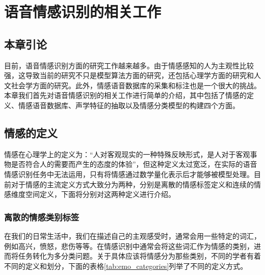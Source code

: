 \chapter{语音情感识别的相关工作}
\label{cha:basic_konwledge}

\section{本章引论}
\label{sec:basic_konwledge_intro}
目前，语音情感识别方面的研究工作越来越多。由于情感感知的人为主观性比较强，这导致当前的研究不只是模型算法方面的研究，还包括心理学方面的研究和人文社会学方面的研究。此外，情感语音数据库的采集和标注也是一个很大的挑战。本章我们首先对语音情感识别的相关工作进行简单的介绍，其中包括了情感的定义、情感语音数据库、声学特征的抽取以及情感分类模型的构建四个方面。


\section{情感的定义}
\label{sec:emo_def}
情感在心理学上的定义为：“人对客观现实的一种特殊反映形式，是人对于客观事物是否符合人的需要而产生的态度的体验”，但这种定义太过宽泛，在实际的语音情感识别任务中无法运用，只有将情感通过数学量化表示后才能够被模型处理。目前对于情感的主流定义方式大致分为两种，分别是离散的情感标签定义和连续的情感维度空间定义，下面将分别对这两种定义进行介绍。

\subsection{离散的情感类别标签}
\label{ssec:discrete_label}
在我们的日常生活中，我们在描述自己的主观感受时，通常会用一些特定的词汇，例如高兴，愤怒，悲伤等等。在情感识别中通常会将这些词汇作为情感的类别，进而将任务转化为多分类问题。关于具体应该将情感分为那些类别，不同的学者有着不同的定义和划分，下面的表格\ref{tab:emo_categories}列举了不同的定义方式。

